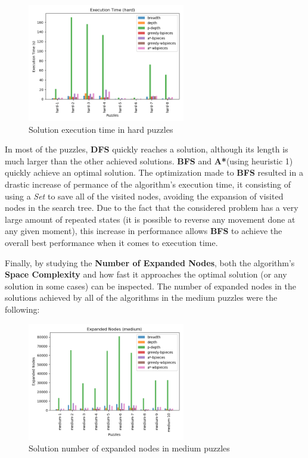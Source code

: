 \documentclass[conference]{IEEEtran}
\begin{document}
\begin{figure}[H]
    \centerline{\includegraphics[width=260px]{../../graphics/executionTime-hard.png}}
    \caption{Solution execution time in hard puzzles}
\end{figure}

In most of the puzzles, \textbf{DFS} quickly reaches a solution, although its length is much larger than the other achieved solutions. \textbf{BFS} and \textbf{A*}(using heuristic 1) quickly achieve an optimal solution. The optimization made to \textbf{BFS} resulted in a drastic increase of permance of the algorithm's execution time, it consisting of using a \textit{Set} to save all of the visited nodes, avoiding the expansion of visited nodes in the search tree. Due to the fact that the considered problem has a very large amount of repeated states (it is possible to reverse any movement done at any given moment), this increase in performance allows \textbf{BFS} to achieve the overall best performance when it comes to execution time.

Finally, by studying the \textbf{Number of Expanded Nodes}, both the algorithm's \textbf{Space Complexity} and how fast it approaches the optimal solution (or any solution in some cases) can be inspected. The number of expanded nodes in the solutions achieved by all of the algorithms in the medium puzzles were the following:

\begin{figure}[H]
    \centerline{\includegraphics[width=260px]{../../graphics/expandedNodes-medium.png}}
    \caption{Solution number of expanded nodes in medium puzzles}
\end{figure}
\end{document}
